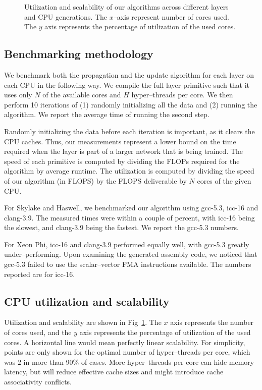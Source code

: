 \begin{figure}
\begin{tabular}{ >{\centering\arraybackslash}c ccccccl }
    \end{tabular}
    \caption{Utilization and scalability of our algorithms across
      different layers and CPU generations.  The $x$--axis represent
      number of cores used.  The $y$ axis represents the percentage of
      utilization of the used cores.}
    \label{fig:scalability}
  \end{figure}

  \subsection{Benchmarking methodology}

  We benchmark both the propagation and the update algorithm for each
  layer on each CPU in the following way.  We compile the full layer
  primitive such that it uses only $N$ of the available cores and $H$
  hyper--threads per core.  We then perform 10 iterations of (1)
  randomly initializing all the data and (2) running the algorithm.
  We report the average time of running the second step.

  Randomly initializing the data before each iteration is important,
  as it clears the CPU caches.  Thus, our measurements represent a
  lower bound on the time required when the layer is part of a larger
  network that is being trained.  The speed of each primitive is
  computed by dividing the FLOPs required for the algorithm by
  average runtime.  The utilization is computed by dividing the speed
  of our algorithm (in FLOPS) by the FLOPS deliverable by $N$ cores of
  the given CPU.

  For Skylake and Haswell, we benchmarked our algorithm
  using gcc-5.3, icc-16 and clang-3.9.  The measured times were within
  a couple of percent, with icc-16 being the slowest, and clang-3.9
  being the fastest.  We report the gcc-5.3 numbers.

  For Xeon Phi, icc-16 and clang-3.9 performed equally well, with
  gcc-5.3 greatly under--performing.  Upon examining the generated
  assembly code, we noticed that gcc-5.3 failed to use the
  scalar--vector FMA instructions available.  The numbers reported are
  for icc-16.

  \subsection{CPU utilization and scalability}

  Utilization and scalability are shown in Fig~\ref{fig:scalability}.
  The $x$ axis represents the number of cores used, and the $y$ axis
  represents the percentage of utilization of the used cores.  A
  horizontal line would mean perfectly linear scalability.  For
  simplicity, points are only shown for the optimal number
  of hyper--threads per core, which was $2$ in more than 90\% of cases.
  More hyper--threads per core can hide memory latency, but will
  reduce effective cache sizes and might introduce cache associativity
  conflicts.

